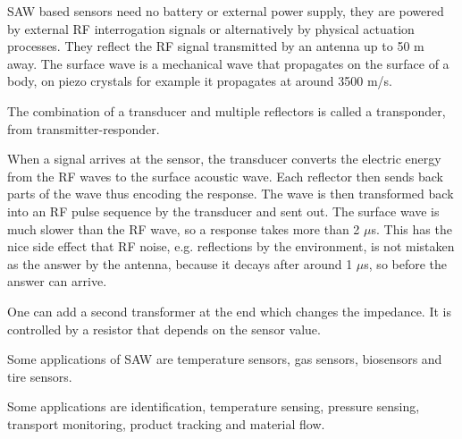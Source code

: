 \begin{mytitle} SAW based sensors need no battery or external power supply, they are powered by external RF interrogation signals or alternatively by physical actuation processes. They reflect the RF signal transmitted by an antenna up to 50 m away. The surface wave is a mechanical wave that propagates on the surface of a body, on piezo crystals for example it propagates at around 3500 m/s.
    \begin{mysubtitle} The combination of a transducer and multiple reflectors is called a transponder, from transmitter-responder.
    \end{mysubtitle}
    \begin{mysubtitle} When a signal arrives at the sensor, the transducer converts the electric energy from the RF waves to the surface acoustic wave. Each reflector then sends back parts of the wave thus encoding the response. The wave is then transformed back into an RF pulse sequence by the transducer and sent out. The surface wave is much slower than the RF wave, so a response takes more than 2 $\mu$s. This has the nice side effect that RF noise, e.g. reflections by the environment, is not mistaken as the answer by the antenna, because it decays after around 1 $\mu$s, so before the answer can arrive.
    \end{mysubtitle}
    \begin{mysubtitle} One can add a second transformer at the end which changes the impedance. It is controlled by a resistor that depends on the sensor value.
    \end{mysubtitle}
\end{mytitle}
\begin{mytitle}[Applications]
    \begin{mysubtitle} Some applications of SAW are temperature sensors, gas sensors, biosensors and tire sensors.
    \end{mysubtitle}
    \begin{mysubtitle} Some applications are identification, temperature sensing, pressure sensing, transport monitoring, product tracking and material flow.
    \end{mysubtitle}
\end{mytitle}
\newpage
